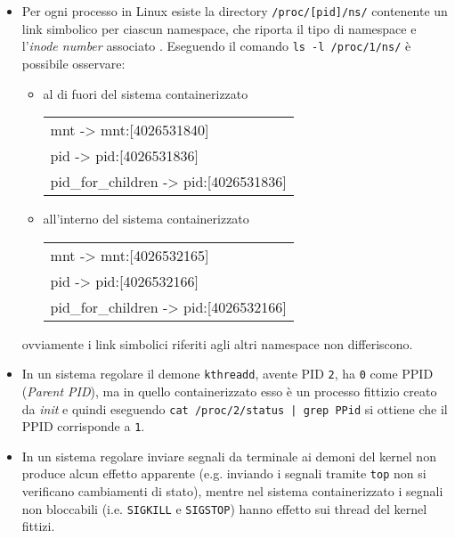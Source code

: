 \documentclass{article}
\begin{document}
\begin{itemize}
	\item Per ogni processo in Linux esiste la directory \texttt{/proc/[pid]/ns/} contenente un link simbolico per ciascun namespace, che riporta il tipo di namespace e l'\textsl{inode number} associato \cite{man namespaces}. Eseguendo il comando \texttt{ls -l /proc/1/ns/} è possibile osservare:
	\begin{itemize}
		\item al di fuori del sistema containerizzato
		\begin{center}
			{\ttfamily
				\begin{tabular}{l}
					mnt -> mnt:[4026531840] \\
					pid -> pid:[4026531836] \\
					pid\_for\_children -> pid:[4026531836]
				\end{tabular}
			}
		\end{center}
		
		\item all'interno del sistema containerizzato
		\begin{center}
			{\ttfamily
				\begin{tabular}{l}
					mnt -> mnt:[4026532165] \\
					pid -> pid:[4026532166] \\
					pid\_for\_children -> pid:[4026532166]
				\end{tabular}
			}
		\end{center}
	\end{itemize}
	ovviamente i link simbolici riferiti agli altri namespace non differiscono.
	
	\item In un sistema regolare il demone \texttt{kthreadd}, avente PID \texttt{2}, ha \texttt{0} come PPID (\textsl{Parent PID}), ma in quello containerizzato esso è un processo fittizio creato da \textsl{init} e quindi eseguendo \texttt{cat /proc/2/status | grep PPid} si ottiene che il PPID corrisponde a \texttt{1}.
	
	\item In un sistema regolare inviare segnali da terminale ai demoni del kernel non produce alcun effetto apparente (e.g. inviando i segnali tramite \texttt{top} non si verificano cambiamenti di stato), mentre nel sistema containerizzato i segnali non bloccabili (i.e. \texttt{SIGKILL} e \texttt{SIGSTOP}) hanno effetto sui thread del kernel fittizi.
\end{itemize}
\end{document}
